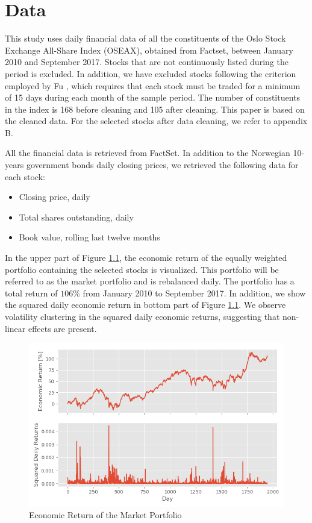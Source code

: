 \chapter{Data}
\label{Data}

This study uses daily financial data of all the constituents of the Oslo Stock Exchange All-Share Index (OSEAX), obtained from Factset, between January 2010 and September 2017. Stocks that are not continuously listed during the period is excluded. In addition, we have excluded stocks following the criterion employed by Fu \cite{Fu}, which requires that each stock must be traded for a minimum of 15 days during each month of the sample period. The number of constituents in the index is 168 before cleaning and 105 after cleaning. This paper is based on the cleaned data. For the selected stocks after data cleaning, we refer to appendix B. 

All the financial data is retrieved from FactSet. In addition to the Norwegian 10-years government bonds daily closing prices, we retrieved the following data for each stock:
\begin{itemize}
    \item Closing price, daily
    \item Total shares outstanding, daily
    \item Book value, rolling last twelve months
\end{itemize}

In the upper part of Figure \ref{MarketReturn}, the economic return of the equally weighted portfolio containing the selected stocks is visualized. This portfolio will be referred to as the market portfolio and is rebalanced daily. The portfolio has a total return of $106\%$ from January 2010 to September 2017. In addition, we show the squared daily economic return in bottom part of Figure \ref{MarketReturn}. We observe volatility clustering in the squared daily economic returns, suggesting that non-linear effects are present.

\begin{figure}[h]
\label{MarketReturn}
    \centering
    \includegraphics[scale = 0.7]{Plot/MarketReturn.png}
    \caption{Economic Return of the Market Portfolio}
    \label{MarketReturn}
\end{figure}

